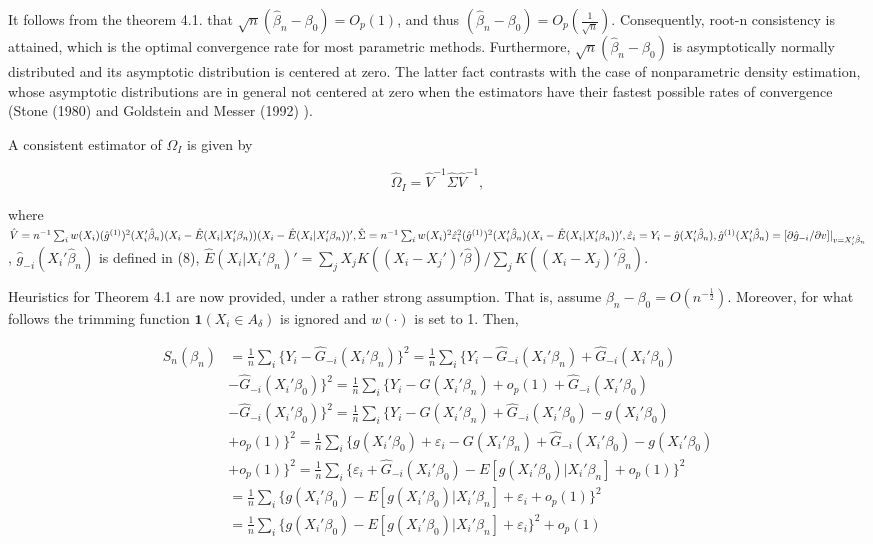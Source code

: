 It follows from the theorem 4.1. that $\sqrt{n}(\hat{\beta}_n - \beta_0)=O_p(1)$, and thus $(\hat{\beta}_n - \beta_0) = O_p\left(\frac{1}{\sqrt{n}}\right)$. Consequently, root-n consistency is attained, which is the optimal convergence rate for most parametric methods. Furthermore, $\sqrt{n}(\hat{\beta}_n - \beta_0)$ is asymptotically normally distributed and its asymptotic distribution is centered at zero. The latter fact contrasts with the case of nonparametric density estimation, whose asymptotic distributions are in general not centered at zero when the estimators have their fastest possible rates of convergence (Stone (1980) \cite{[15]} and Goldstein and Messer (1992) \cite{[16]}). 


A consistent estimator of $\Omega_I$ is given by

\[ \hat{\Omega}_I = \hat{V}^{-1}\hat{\Sigma}\hat{V}^{-1}, \]

where $\hat{V} = n^{-1}\sum_{i} w(X_i)(\hat{g}^{(1)})^2(X_i'\hat{\beta}_n)(X_i - \hat{E}(X_i|X_i'\beta_n))(X_i - \hat{E}(X_i|X_i'\beta_n))', \hat{\Sigma} = n^{-1}\sum_{i} w(X_i)^2\hat{\varepsilon}_{i}^{2}(\hat{g}^{(1)})^2(X_i'\hat{\beta}_n)(X_i - \hat{E}(X_i|X_i'\beta_n))', \hat{\varepsilon}_i = Y_i - \hat{g}(X_i'\hat{\beta}_n), \hat{g}^{(1)}(X_i'\hat{\beta}_n) \linebreak
= [\partial \hat{g}_{-i}/\partial v]|_{v = X_i'\hat{\beta}_n}$, $\hat{g}_{-i}(X_i'\hat{\beta}_n)$ is defined in (8), $\hat{E}(X_i|X_i'\beta_n)' = \sum_{j} X_jK((X_i - X_j')'\hat{\beta})/ \sum_{j}K((X_i - X_j)'\hat{\beta}_n).$

Heuristics for Theorem 4.1 are now provided, under a rather strong assumption. That is, assume $\beta_n - \beta_0 = O(n^{-\frac{1}{2}})$. Moreover, for what follows the trimming function $\mathbf{1}(X_i \in A_\delta)$ is ignored and $w(\cdot)$ is set to 1. Then, 


\begin{align*}
S_{n}(\beta_n) & = \frac{1}{n}\sum_i \{ Y_i - \hat{G}_{-i}(X_i'\beta_n)\}^2 = \frac{1}{n}\sum_i\{Y_i - \hat{G}_{-i}(X_i'\beta_n) +  \hat{G}_{-i}(X_i'\beta_0) \\
               & - \hat{G}_{-i}(X_i'\beta_0) \}^2 = \frac{1}{n} \sum_i \{Y_i - G(X_i'\beta_n) + o_p(1) + \hat{G}_{-i}(X_i'\beta_0) \\
               & - \hat{G}_{-i}(X_i'\beta_0) \}^2 = \frac{1}{n}\sum_i \{ Y_i - G(X_i'\beta_n) + \hat{G}_{-i}(X_i'\beta_0) - g(X_i'\beta_0) \\
               &  + o_p(1) \}^2 = \frac{1}{n} \sum_i \{ g(X_i'\beta_0) + \varepsilon_i - G(X_i'\beta_n) + \hat{G}_{-i}(X_i'\beta_0) - g(X_i'\beta_0)\\
               & + o_p(1) \}^2 = \frac{1}{n} \sum_i \{ \varepsilon_i + \hat{G}_{-i}(X_i'\beta_0) - E[g(X_i'\beta_0)|X_i'\beta_n]  + o_p(1) \}^2 \\
               &= \frac{1}{n}\sum_i \{ g(X_i'\beta_0) - E[g(X_i'\beta_0)|X_i'\beta_n] +  \varepsilon_i + o_p(1)\}^2 \\
             & = \frac{1}{n}\sum_i \{ g(X_i'\beta_0) - E[g(X_i'\beta_0)|X_i'\beta_n] +  \varepsilon_i\}^2 + o_p(1)
\end{align*}


